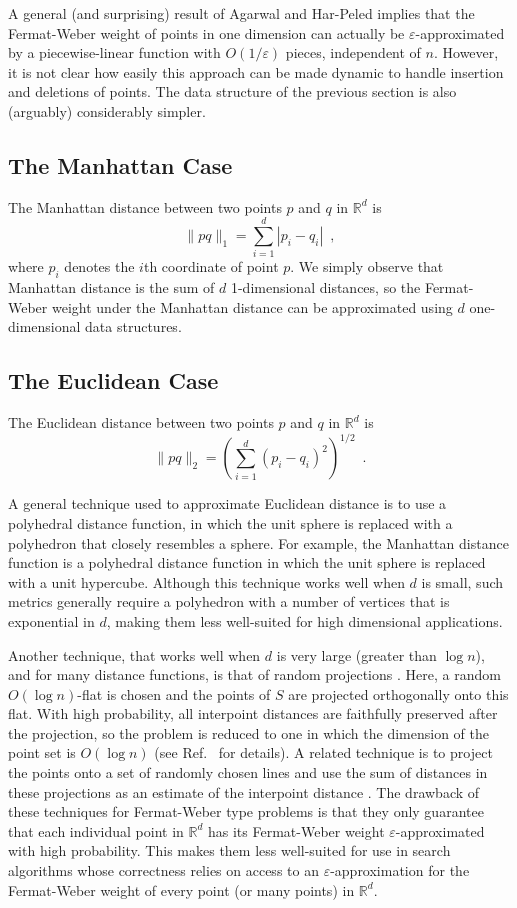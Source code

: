 \documentclass[charterfonts,lotsofwhite]{patmorin}
\newcommand{\eps}{\varepsilon}
\newcommand{\Real}{\mathbb{R}}
\begin{document}
\begin{rem} 
A general (and surprising) result of Agarwal and Har-Peled \cite{ah01}
implies that the Fermat-Weber weight of points in one dimension can
actually be $\eps$-approximated by a piecewise-linear function with
$O(1/\eps)$ pieces, independent of $n$.  However, it is not clear how 
easily this approach
can be made dynamic to handle insertion and deletions of points. 
The data structure of the previous section is also (arguably)
considerably simpler.
\end{rem}

\subsection{The Manhattan Case}

The Manhattan distance between two points $p$ and $q$ in $\Real^d$ is
\[
\|pq\|_1 = \sum_{i=1}^d |p_i-q_i| \enspace ,
\]
where $p_i$ denotes the $i$th coordinate of point $p$.  We simply
observe that Manhattan distance is the sum of $d$ 1-dimensional
distances, so the Fermat-Weber weight under the Manhattan distance can
be approximated using $d$ one-dimensional data structures.

\subsection{The Euclidean Case}

The Euclidean distance between two points $p$ and $q$ in $\Real^d$ is
\[
\|pq\|_2 = \left(\sum_{i=1}^d (p_i-q_i)^2\right)^{1/2} \enspace .
\]

A general technique used to approximate Euclidean distance is to use a
polyhedral distance function, in which the unit sphere is replaced
with a polyhedron that closely resembles a sphere.  For example, the
Manhattan distance function is a polyhedral distance function in which
the unit sphere is replaced with a unit hypercube.  Although this
technique works well when $d$ is small, such metrics generally require
a polyhedron with a number of vertices that is exponential in $d$,
making them less well-suited for high dimensional applications.

Another technique, that works well when $d$ is very large (greater
than $\log n$), and for many distance functions, is that of random
projections \cite{i01}. Here, a random $O(\log n)$-flat is chosen and
the points of $S$ are projected orthogonally onto this flat.  With
high probability, all interpoint distances are faithfully preserved
after the projection, so the problem is reduced to one in which the
dimension of the point set is $O(\log n)$ (see
Ref.~\cite[Lemma~3]{i01} for details).  A related technique is to
project the points onto a set of randomly chosen lines and use the sum
of distances in these projections as an estimate of the interpoint
distance \cite{k97}.  The drawback of these techniques for
Fermat-Weber type problems is that they only guarantee that each
individual point in $\mathbb{R}^d$ has its Fermat-Weber weight
$\eps$-approximated with high probability.  This makes them less
well-suited for use in search algorithms whose correctness relies on
access to an $\eps$-approximation for the Fermat-Weber weight of every
point (or many points) in $\mathbb{R}^d$.
\end{document}
